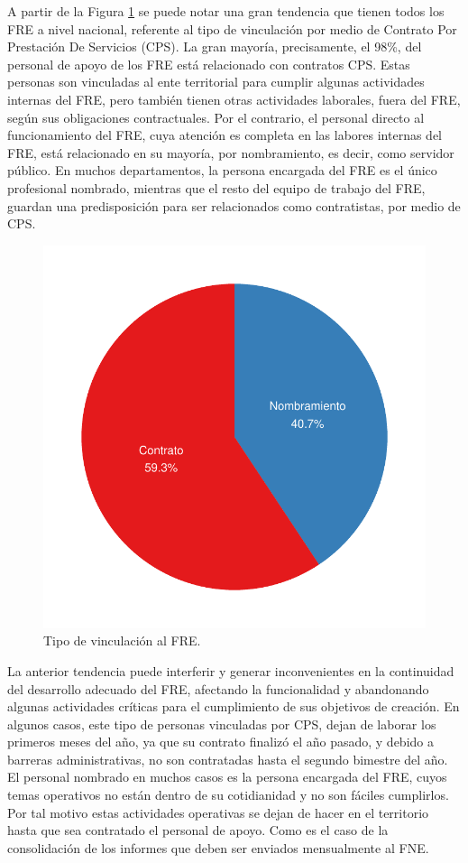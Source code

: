 \documentclass[
]{book}
\begin{document}
A partir de la Figura \ref{fig:pieProfesional2} se puede notar una gran tendencia que tienen todos los FRE a nivel nacional, referente al tipo de vinculación por medio de Contrato Por Prestación De Servicios (CPS). La gran mayoría, precisamente, el 98\%, del personal de apoyo de los FRE está relacionado con contratos CPS. Estas personas son vinculadas al ente territorial para cumplir algunas actividades internas del FRE, pero también tienen otras actividades laborales, fuera del FRE, según sus obligaciones contractuales. Por el contrario, el personal directo al funcionamiento del FRE, cuya atención es completa en las labores internas del FRE, está relacionado en su mayoría, por nombramiento, es decir, como servidor público. En muchos departamentos, la persona encargada del FRE es el único profesional nombrado, mientras que el resto del equipo de trabajo del FRE, guardan una predisposición para ser relacionados como contratistas, por medio de CPS.

\begin{figure}[h]

{\centering \includegraphics[width=0.85\linewidth]{InformeFinal_files/figure-latex/pieProfesional2-1} 

}

\caption{Tipo de vinculación al FRE.}\label{fig:pieProfesional2}
\end{figure}

La anterior tendencia puede interferir y generar inconvenientes en la continuidad del desarrollo adecuado del FRE, afectando la funcionalidad y abandonando algunas actividades críticas para el cumplimiento de sus objetivos de creación. En algunos casos, este tipo de personas vinculadas por CPS, dejan de laborar los primeros meses del año, ya que su contrato finalizó el año pasado, y debido a barreras administrativas, no son contratadas hasta el segundo bimestre del año. El personal nombrado en muchos casos es la persona encargada del FRE, cuyos temas operativos no están dentro de su cotidianidad y no son fáciles cumplirlos. Por tal motivo estas actividades operativas se dejan de hacer en el territorio hasta que sea contratado el personal de apoyo. Como es el caso de la consolidación de los informes que deben ser enviados mensualmente al FNE.
\end{document}
